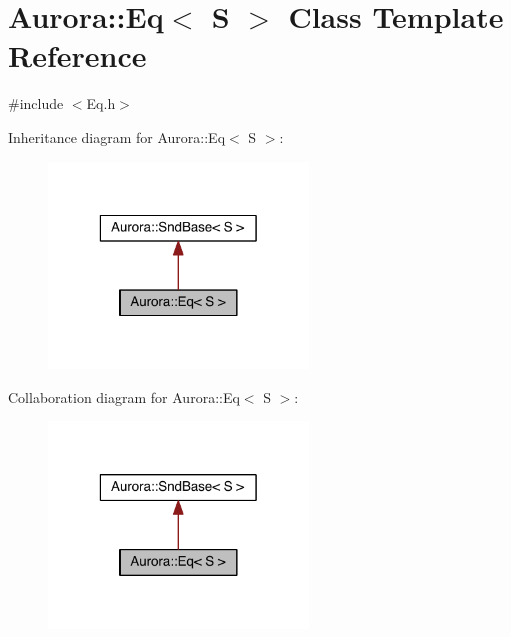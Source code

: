 \hypertarget{class_aurora_1_1_eq}{}\section{Aurora\+:\+:Eq$<$ S $>$ Class Template Reference}
\label{class_aurora_1_1_eq}


{\ttfamily \#include $<$Eq.\+h$>$}



Inheritance diagram for Aurora\+:\+:Eq$<$ S $>$\+:\nopagebreak
\begin{figure}[H]
\begin{center}
\leavevmode
\includegraphics[width=196pt]{class_aurora_1_1_eq__inherit__graph}
\end{center}
\end{figure}


Collaboration diagram for Aurora\+:\+:Eq$<$ S $>$\+:\nopagebreak
\begin{figure}[H]
\begin{center}
\leavevmode
\includegraphics[width=196pt]{class_aurora_1_1_eq__coll__graph}
\end{center}
\end{figure}
